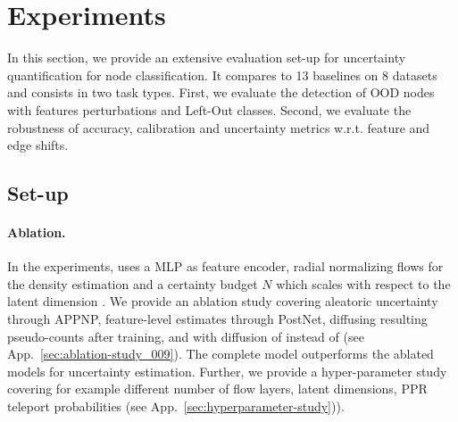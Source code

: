 \section{Experiments} 
\label{sec:experiments_009}

In this section, we provide an extensive evaluation set-up for uncertainty quantification for node classification. It compares \textbf{\GPNacro{}} to 13 baselines on 8 datasets and consists in two task types. First, we evaluate the detection of OOD nodes with features perturbations and Left-Out classes. Second, we evaluate the robustness of accuracy, calibration and uncertainty metrics w.r.t. feature and edge shifts.

\subsection{Set-up}

\paragraph{Ablation.} In the experiments, \GPNacro{} uses a MLP as feature encoder, radial normalizing flows \citep{Rezende2015} for the density estimation and a certainty budget $N$ which scales with respect to the latent dimension \citep{NatPN2021}. We provide an ablation study covering aleatoric uncertainty through APPNP, feature-level estimates through PostNet, diffusing resulting pseudo-counts after training, and \GPNacro{} with diffusion of  instead of  (see App.~\ref{sec:ablation-study_009}). The complete \GPNacro{} model outperforms the ablated models for uncertainty estimation. Further, we provide a hyper-parameter study covering for example different number of flow layers, latent dimensions, PPR teleport probabilities (see App.~\ref{sec:hyperparameter-study})). 

